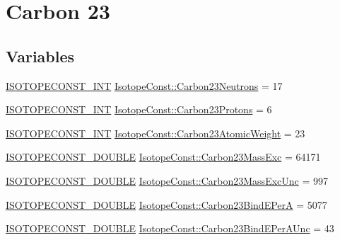 \hypertarget{group___isotope_const-_carbon-_c23}{}\section{Carbon 23}
\label{group___isotope_const-_carbon-_c23}
\subsection*{Variables}
\begin{DoxyCompactItemize}
\item 
\mbox{\hyperlink{group___isotope_const-_macros_ga5f18360b3e99483a35c32d789e62621c}{I\+S\+O\+T\+O\+P\+E\+C\+O\+N\+S\+T\+\_\+\+I\+NT}} \mbox{\hyperlink{group___isotope_const-_carbon-_c23_ga47173b3089c2016d742ecaafa400ca1e}{Isotope\+Const\+::\+Carbon23\+Neutrons}} = 17
\item 
\mbox{\hyperlink{group___isotope_const-_macros_ga5f18360b3e99483a35c32d789e62621c}{I\+S\+O\+T\+O\+P\+E\+C\+O\+N\+S\+T\+\_\+\+I\+NT}} \mbox{\hyperlink{group___isotope_const-_carbon-_c23_ga1ca86a9257cd7dc3131c94704269faac}{Isotope\+Const\+::\+Carbon23\+Protons}} = 6
\item 
\mbox{\hyperlink{group___isotope_const-_macros_ga5f18360b3e99483a35c32d789e62621c}{I\+S\+O\+T\+O\+P\+E\+C\+O\+N\+S\+T\+\_\+\+I\+NT}} \mbox{\hyperlink{group___isotope_const-_carbon-_c23_gabd9f01e60ef633cab5ebed22fea8d2d7}{Isotope\+Const\+::\+Carbon23\+Atomic\+Weight}} = 23
\item 
\mbox{\hyperlink{group___isotope_const-_macros_ga8f45a7272ce02c0b4c65c44636ed719a}{I\+S\+O\+T\+O\+P\+E\+C\+O\+N\+S\+T\+\_\+\+D\+O\+U\+B\+LE}} \mbox{\hyperlink{group___isotope_const-_carbon-_c23_ga3a51a7867fb856ad0fcd23469065ffde}{Isotope\+Const\+::\+Carbon23\+Mass\+Exc}} = 64171
\item 
\mbox{\hyperlink{group___isotope_const-_macros_ga8f45a7272ce02c0b4c65c44636ed719a}{I\+S\+O\+T\+O\+P\+E\+C\+O\+N\+S\+T\+\_\+\+D\+O\+U\+B\+LE}} \mbox{\hyperlink{group___isotope_const-_carbon-_c23_gabe0d1f480d6ec844545aaecd362c131b}{Isotope\+Const\+::\+Carbon23\+Mass\+Exc\+Unc}} = 997
\item 
\mbox{\hyperlink{group___isotope_const-_macros_ga8f45a7272ce02c0b4c65c44636ed719a}{I\+S\+O\+T\+O\+P\+E\+C\+O\+N\+S\+T\+\_\+\+D\+O\+U\+B\+LE}} \mbox{\hyperlink{group___isotope_const-_carbon-_c23_ga5793313a58724cd1e460816d0b289b0d}{Isotope\+Const\+::\+Carbon23\+Bind\+E\+PerA}} = 5077
\item 
\mbox{\hyperlink{group___isotope_const-_macros_ga8f45a7272ce02c0b4c65c44636ed719a}{I\+S\+O\+T\+O\+P\+E\+C\+O\+N\+S\+T\+\_\+\+D\+O\+U\+B\+LE}} \mbox{\hyperlink{group___isotope_const-_carbon-_c23_ga4c4584821850e8ae1358cf9ea7de18d3}{Isotope\+Const\+::\+Carbon23\+Bind\+E\+Per\+A\+Unc}} = 43

\end{DoxyCompactItemize}
